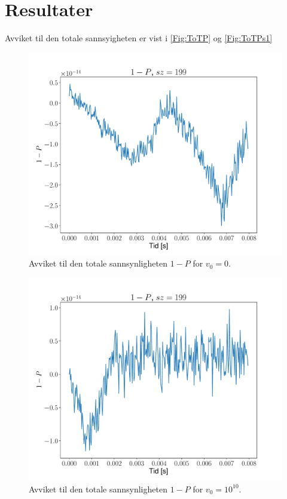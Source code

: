 \documentclass[reprint,english,notitlepage]{revtex4-2}  %
\begin{document}
\section{Resultater}
Avviket til den totale sannsyigheten er vist i \autoref{Fig:ToTP} og \autoref{Fig:ToTPs1}

\begin{figure}
	\centering
	\includegraphics[scale=0.4, trim={2cm 0 0 0}]{../Images/7P199.pdf}
	\caption{Avviket til den totale sannsynligheten $1 - P$ for $v_0 = 0 $.}
	\label{Fig:ToTP}
\end{figure}

\begin{figure}
	\centering
	\includegraphics[scale=0.4, trim={0 0 0 0}]{../Images/7s1P199.pdf}
	\caption{Avviket til den totale sannsynligheten $1 - P$ for $v_0 = 10^10$.}
	\label{Fig:ToTPs1}
\end{figure}
\end{document}
